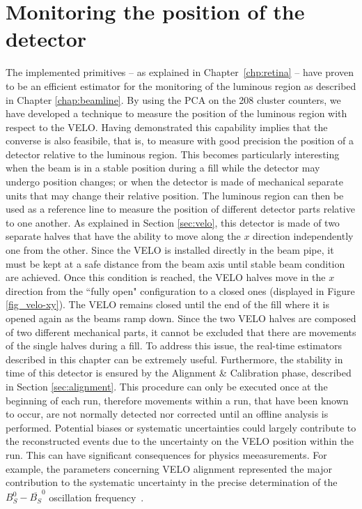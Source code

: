 \chapter{Monitoring the position of the detector}
\label{chap:pos_VELO}
The implemented primitives -- as explained in Chapter~\ref{chp:retina} -- have proven to be an efficient estimator for the monitoring of the luminous region as described in Chapter \ref{chap:beamline}. By using the PCA on the 208 cluster counters, we have developed a technique to measure the position of the luminous region with respect to the VELO. Having demonstrated this capability implies that the converse is also feasibile, that is, to measure with good precision the position of a detector relative to the luminous region. This becomes particularly interesting when the beam is in a stable position during a fill while the detector may undergo position changes; or when the detector is made of mechanical separate units that may change their relative position. The luminous region can then be used as a reference line to measure the position of different detector parts relative to one another.  As explained in Section \ref{sec:velo}, this detector is made of two separate halves that have the ability to move along the $x$ direction  independently one from the other. Since the VELO is installed directly in the beam pipe, it must be kept at a safe distance from the beam axis until stable beam condition are achieved. Once this condition is reached, the VELO halves move in the $x$ direction from the ``fully open" configuration to a closed ones (displayed in Figure \ref{fig_velo-xy}). The VELO remains closed until the end of the fill where it is opened again as the beams ramp down. Since the two VELO halves are composed of two different mechanical parts, it cannot be excluded that there are movements of the single halves during a fill. To address this issue, the real-time estimators described in this chapter can be extremely useful. 
Furthermore, the stability in time of this detector is ensured by the Alignment \& Calibration phase, described in Section \ref{sec:alignment}.  This procedure can only be executed once at the beginning of each run, therefore movements within a run, that have been known to occur, are not normally detected nor corrected until an offline analysis is performed. Potential biases or systematic uncertainties could largely contribute to the reconstructed events due to the uncertainty on the VELO position within the run. This can have significant consequences for physics meeasurements. For example, the parameters concerning VELO alignment represented the major contribution to the systematic uncertainty in the precise determination of the $B_S^0-\overline{B_S} ^0$ oscillation frequency~\cite{b0b0soscillation}.

